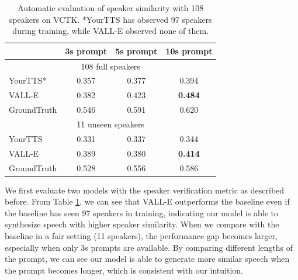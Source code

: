 \documentclass{article}
\theoremstyle{plain}
\theoremstyle{definition}
\theoremstyle{remark}
\newcommand\our{\textsc{VALL-E}}
\begin{document}
\begin{table}[h]
\begin{center}
\caption{Automatic evaluation of speaker similarity with 108 speakers on VCTK. *YourTTS has observed 97 speakers during training, while \our{} observed none of them. \label{exp:vctk_spk}}
\begin{tabular}{lccc}
\toprule
& 3s prompt & 5s prompt & 10s prompt  \\
\hline
\multicolumn{4}{c}{108 full speakers} \\
\hline
YourTTS* & 0.357 &   0.377 &  0.394 \\ 
\our{} & 0.382 &   0.423  & \textbf{0.484}  \\ 
GroundTruth & 0.546 &  0.591 &  0.620   \\ 
\hline
\multicolumn{4}{c}{11 unseen speakers} \\
\hline
YourTTS  & 0.331 &  0.337 &   0.344 \\ 
\our{} & 0.389 &  0.380 &   \textbf{0.414}   \\ 
GroundTruth & 0.528 &  0.556 &   0.586  \\ 
         \bottomrule
\end{tabular}

\end{center}
\end{table}
We first evaluate two models with the speaker verification metric as described before. 
From Table \ref{exp:vctk_spk}, we can see that \our{} outperforms the baseline even if the baseline has seen 97 speakers in training, indicating our model is able to synthesize speech with higher speaker similarity. When we compare with the baseline in a fair setting (11 speakers), the performance gap becomes larger, especially when only 3s prompts are available. By comparing different lengths of the prompt, we can see our model is able to generate more similar speech when the prompt becomes longer, which is consistent with our intuition.  
\end{document}
